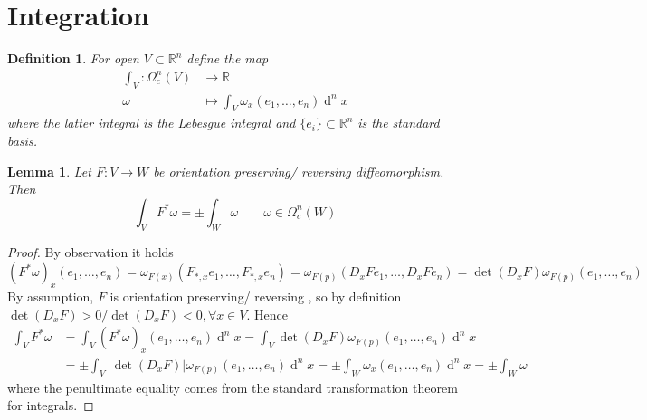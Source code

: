 \documentclass{article}
\numberwithin{theorem}{section}
\newtheorem{lemma}[theorem]{Lemma}
\newtheorem{definition}[theorem]{Definition}
\renewcommand{\d}[1]{\ensuremath{\operatorname{d}\!{#1}}}
\newcommand{\R}{\mathbb{R}}
\newcommand{\1}{\mathds{1}}
\begin{document}
\section{Integration}
\begin{definition}
    For open $V \subset \R^n$ define the map 
    \begin{align*}
        \int_{V} : \Omega^n_c(V) &\to \R  \\
     \omega &\mapsto \int_V \omega_x(e_1, \dots, e_n) \d{}^nx 
    \end{align*}
    where the latter integral is the Lebesgue integral and $\{ e_i \} \subset \R^n$ is the standard basis.
\end{definition}

\begin{lemma}
    Let $F: V \to W $ be orientation preserving/ reversing diffeomorphism. Then 
    \[ \int_{V} F^* \omega = \pm \int_{W} \omega \qquad \omega \in \Omega^n_c(W) \]
\end{lemma}

\begin{proof}
    By observation it holds 
    \[ (F^*\omega)_x(e_1, \dots, e_n) = \omega_{F(x)}(F_{*,x}e_1, \dots, F_{*,x} e_n) = \omega_{F(p)}(D_xF e_1, \dots, D_xF e_n) = \det(D_xF) \omega_{F(p)}(e_1, \dots, e_n)  \] 
    By assumption, $F$ is orientation preserving/ reversing , so by definition $\det(D_xF) > 0 / \det(D_xF) < 0 , \forall x \in V $. Hence 
    \begin{align*}
        \int_V F^* \omega &= \int_V (F^*\omega)_x(e_1, \dots, e_n) \d{}^nx = \int_V \det(D_x F) \omega_{F(p)}(e_1, \dots, e_n) \d{}^nx  \\
        &= \pm \int_V |\det(D_xF)| \omega_{F(p)}(e_1, \dots, e_n) \d{}^n x  =  \pm \int_W \omega_x(e_1, \dots, e_n) \d{}^n x =  \pm  \int_W \omega 
    \end{align*}
    where the penultimate equality comes from the standard transformation theorem for integrals. 
\end{proof}
\end{document}
